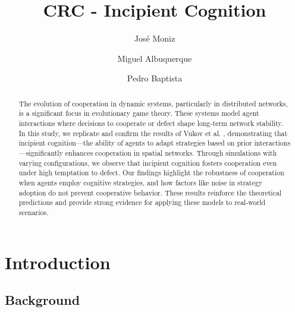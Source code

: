 \documentclass[runningheads]{llncs}
\begin{document}
%
\title{CRC - Incipient Cognition}


%
%
\author{José Moniz \and Miguel Albuquerque \and
Pedro Baptista}



%
\maketitle              %
%



\begin{abstract}
The evolution of cooperation in dynamic systems, particularly in distributed networks,
is a significant focus in evolutionary game theory. These systems model agent
interactions where decisions to cooperate or defect shape long-term network stability.
In this study, we replicate and confirm the results of Vukov et al. \cite{vukov},
demonstrating that incipient cognition—the ability of agents to adapt
strategies based on prior interactions—significantly enhances cooperation in spatial networks.
Through simulations with varying configurations, we observe that incipient cognition fosters
cooperation even under high temptation to defect. Our findings highlight the
robustness of cooperation when agents employ cognitive strategies, and how factors
like noise in strategy adoption do not prevent cooperative behavior.
These results reinforce the theoretical predictions and provide strong evidence
for applying these models to real-world scenarios.

\end{abstract}



\section{Introduction}

\subsection{Background}
\end{document}
